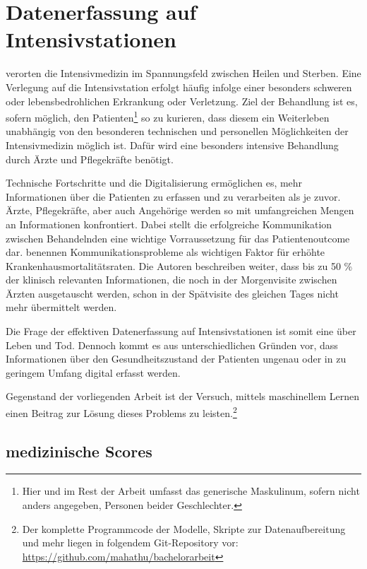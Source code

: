 \section{Datenerfassung auf Intensivstationen}
\cite{marxIntensivmedizin2015c} verorten die Intensivmedizin im Spannungsfeld zwischen Heilen und Sterben. Eine Verlegung auf die Intensivstation erfolgt häufig infolge einer besonders schweren oder lebensbedrohlichen Erkrankung oder Verletzung. 
Ziel der Behandlung ist es, sofern möglich, den Patienten\footnote{Hier und im Rest der Arbeit umfasst das generische Maskulinum, sofern nicht anders angegeben, Personen beider Geschlechter.} so zu kurieren, dass diesem ein Weiterleben unabhängig von den besonderen technischen und personellen Möglichkeiten der Intensivmedizin möglich ist. Dafür wird eine besonders intensive Behandlung durch Ärzte und Pflegekräfte benötigt.

Technische Fortschritte und die Digitalisierung ermöglichen es, mehr Informationen über die Patienten zu erfassen und zu verarbeiten als je zuvor. Ärzte, Pflegekräfte, aber auch Angehörige werden so mit umfangreichen Mengen an Informationen konfrontiert. Dabei stellt die erfolgreiche Kommunikation zwischen Behandelnden eine wichtige Vorraussetzung für das Patientenoutcome dar. \cite{marxIntensivmedizin2015c} benennen Kommunikationsprobleme als wichtigen Faktor für erhöhte Krankenhausmortalitätsraten. Die Autoren beschreiben weiter, dass bis zu 50 \% der klinisch relevanten Informationen, die noch in der Morgenvisite zwischen Ärzten ausgetauscht werden, schon in der Spätvisite des gleichen Tages nicht mehr übermittelt werden. %

Die Frage der effektiven Datenerfassung auf Intensivstationen ist somit eine über Leben und Tod. Dennoch kommt es aus unterschiedlichen Gründen vor, dass Informationen über den Gesundheitszustand der Patienten ungenau oder in zu geringem Umfang digital erfasst werden. 

Gegenstand der vorliegenden Arbeit ist der Versuch, mittels maschinellem Lernen einen Beitrag zur Lösung dieses Problems zu leisten.\footnote{Der komplette Programmcode der Modelle, Skripte zur Datenaufbereitung und mehr liegen in folgendem Git-Repository vor: \url{https://github.com/mahathu/bachelorarbeit}}

\subsection{medizinische Scores} \label{section:scores}


